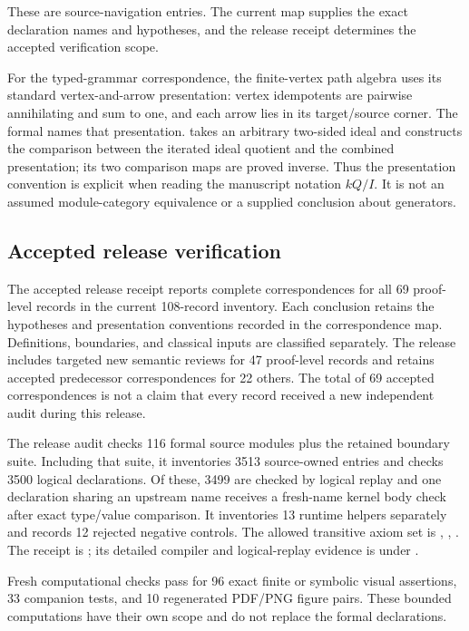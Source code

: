 These are source-navigation entries. The current map supplies the exact declaration names and hypotheses, and the release receipt determines the accepted verification scope.

For the typed-grammar correspondence, the finite-vertex path algebra uses its standard vertex-and-arrow presentation: vertex idempotents are pairwise annihilating and sum to one, and each arrow lies in its target/source corner. The formal  names that presentation.  takes an arbitrary two-sided ideal and constructs the comparison between the iterated ideal quotient and the combined presentation; its two comparison maps are proved inverse. Thus the presentation convention is explicit when reading the manuscript notation $kQ/I$. It is not an assumed module-category equivalence or a supplied conclusion about generators.



\subsection{Accepted release verification}

The accepted release receipt reports complete correspondences for all 69 proof-level records in the current 108-record inventory. Each conclusion retains the hypotheses and presentation conventions recorded in the correspondence map. Definitions, boundaries, and classical inputs are classified separately. The release includes targeted new semantic reviews for 47 proof-level records and retains accepted predecessor correspondences for 22 others. The total of 69 accepted correspondences is not a claim that every record received a new independent audit during this release.

The release audit checks 116 formal source modules plus the retained boundary suite. Including that suite, it inventories 3513 source-owned entries and checks 3500 logical declarations. Of these, 3499 are checked by logical replay and one declaration sharing an upstream name receives a fresh-name kernel body check after exact type/value comparison. It inventories 13 runtime helpers separately and records 12 rejected negative controls. The allowed transitive axiom set is , , . The receipt is ; its detailed compiler and logical-replay evidence is under .

Fresh computational checks pass for 96 exact finite or symbolic visual assertions, 33 companion tests, and 10 regenerated PDF/PNG figure pairs. These bounded computations have their own scope and do not replace the formal declarations.

